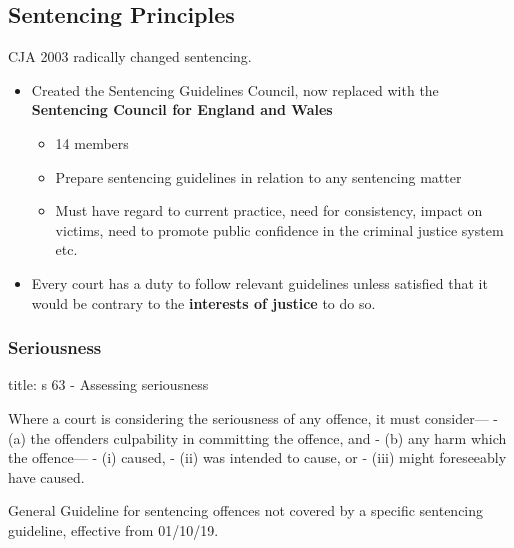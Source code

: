 \documentclass[
]{article}
\newenvironment{Shaded}{}{}
\newcommand{\NormalTok}[1]{#1}
\providecommand{\tightlist}{%
  \setlength{\itemsep}{0pt}\setlength{\parskip}{0pt}}
\begin{document}
\hypertarget{sentencing-principles}{%
\subsection{Sentencing Principles}\label{sentencing-principles}}

CJA 2003 radically changed sentencing.

\begin{itemize}
\tightlist
\item
  Created the Sentencing Guidelines Council, now replaced with the
  \textbf{Sentencing Council for England and Wales}

  \begin{itemize}
  \tightlist
  \item
    14 members
  \item
    Prepare sentencing guidelines in relation to any sentencing matter
  \item
    Must have regard to current practice, need for consistency, impact
    on victims, need to promote public confidence in the criminal
    justice system etc.
  \end{itemize}
\item
  Every court has a duty to follow relevant guidelines unless satisfied
  that it would be contrary to the \textbf{interests of justice} to do
  so.
\end{itemize}

\hypertarget{seriousness}{%
\subsubsection{Seriousness}\label{seriousness}}

\begin{Shaded}
\begin{Highlighting}[]
\NormalTok{title: s 63 {-} Assessing seriousness}

\NormalTok{Where a court is considering the seriousness of any offence, it must consider—}
\NormalTok{{-} (a) the offender\textquotesingle{}s culpability in committing the offence, and}
\NormalTok{{-} (b) any harm which the offence—}
\NormalTok{    {-} (i) caused,}
\NormalTok{    {-} (ii) was intended to cause, or}
\NormalTok{    {-} (iii) might foreseeably have caused. }
\end{Highlighting}
\end{Shaded}

General Guideline for sentencing offences not covered by a specific
sentencing guideline, effective from 01/10/19.
\end{document}
